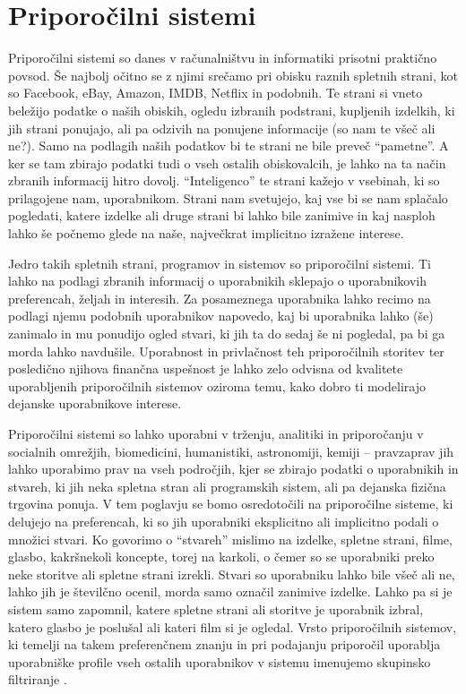 \chapter{Priporočilni sistemi}

Priporočilni sistemi so danes v računalništvu in informatiki prisotni
praktično povsod. Še najbolj očitno se z njimi srečamo pri obisku
raznih spletnih strani, kot so Facebook, eBay, Amazon, IMDB, Netflix in podobnih. Te strani si vneto beležijo podatke o naših obiskih, ogledu izbranih podstrani, kupljenih izdelkih, ki jih strani ponujajo, ali pa odzivih na ponujene informacije (so nam te všeč ali ne?). Samo na podlagih naših podatkov bi te strani ne bile preveč ``pametne''. A ker se tam zbirajo podatki tudi o vseh ostalih obiskovalcih, je lahko na ta način zbranih informacij hitro dovolj. ``Inteligenco'' te strani kažejo v vsebinah, ki so prilagojene nam, uporabnikom. Strani nam svetujejo, kaj vse bi se nam splačalo pogledati, katere izdelke ali druge strani bi lahko bile zanimive in kaj nasploh lahko še počnemo glede na naše, največkrat implicitno izražene interese.

Jedro takih spletnih strani, programov in sistemov so priporočilni sistemi. Ti
lahko na podlagi zbranih informacij o uporabnikih sklepajo o uporabnikovih preferencah, željah in interesih. Za posameznega uporabnika lahko recimo na podlagi njemu podobnih uporabnikov napovedo, kaj bi uporabnika lahko (še) zanimalo in mu ponudijo ogled stvari, ki jih ta do sedaj še ni pogledal, pa bi ga morda lahko navdušile. Uporabnost in privlačnost teh priporočilnih storitev ter posledično njihova finančna uspešnost je lahko zelo odvisna od kvalitete uporabljenih priporočilnih sistemov oziroma temu, kako dobro ti modelirajo dejanske uporabnikove interese.

Priporočilni sistemi so lahko uporabni v trženju, analitiki in priporočanju v socialnih omrežjih, biomedicini, humanistiki, astronomiji, kemiji -- pravzaprav jih lahko uporabimo prav na vseh področjih, kjer se zbirajo podatki o uporabnikih in stvareh, ki jih neka spletna stran ali programskih sistem, ali pa dejanska fizična trgovina ponuja. V tem poglavju se bomo osredotočili na priporočilne sisteme, ki delujejo na preferencah, ki so jih uporabniki eksplicitno ali implicitno podali o množici stvari. Ko govorimo o ``stvareh'' mislimo na izdelke, spletne strani, filme, glasbo, kakršnekoli koncepte, torej na karkoli, o čemer so se uporabniki preko neke storitve ali spletne strani izrekli. Stvari so uporabniku lahko bile všeč ali ne, lahko jih je številčno ocenil, morda samo označil zanimive izdelke. Lahko pa si je sistem samo zapomnil, katere spletne strani ali storitve je uporabnik izbral, katero glasbo je poslušal ali kateri film si je ogledal. Vrsto priporočilnih sistemov, ki temelji na takem preferenčnem znanju in pri podajanju priporočil uporablja uporabniške profile vseh ostalih uporabnikov v sistemu imenujemo skupinsko filtriranje .

